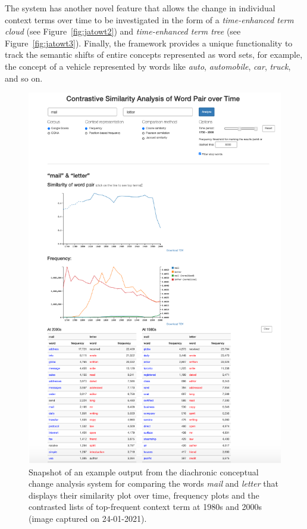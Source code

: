 \documentclass[output=paper%
]{langsci/langscibook}
\begin{document}
The system has another novel feature that allows the change in individual context terms over time to be investigated in the form of a \emph{time-enhanced term cloud} (see Figure~\ref{fig:jatowt2}) and \emph{time-enhanced term tree} (see Figure~\ref{fig:jatowt3}). Finally, the framework provides a unique functionality to track the semantic shifts of entire concepts represented as word sets, for example, the concept of a vehicle represented by words like \emph{auto}, \emph{automobile}, \emph{car}, \emph{truck}, and so on. 

\begin{figure}
	\includegraphics[width=.915\textwidth]{figures/JATOWT_jatowt0.png}
        \caption{Snapshot of an example output from the diachronic conceptual change analysis system for comparing the words \textit{mail} and \textit{letter} that displays their similarity plot over time, frequency plots and the contrasted lists of top-frequent context term at 1980s and 2000s (image captured on 24-01-2021).\label{fig:jatowt0}}
\end{figure}
\end{document}
